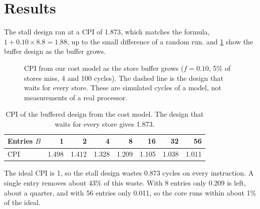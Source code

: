 \section{Results}
\label{sec:cpiresults}

The stall design ran at a CPI of 1.873, which matches the formula, $1 + 0.10 \times 8.8 = 1.88$, up to the small difference of a random run.  and \cref{tab:cpi} show the buffer design as the buffer grows.

\begin{figure}[!htbp]
\centering
{}
\caption{CPI from our cost model as the store buffer grows ($f = 0.10$, 5\% of stores miss, 4 and 100 cycles). The dashed line is the design that waits for every store. These are simulated cycles of a model, not measurements of a real processor.}
\label{fig:cpi}
\end{figure}

\begin{table}[!htbp]
\centering\small
\caption{CPI of the buffered design from the cost model. The design that waits for every store gives 1.873.}
\label{tab:cpi}
\begin{tabular}{@{}lrrrrrrr@{}}
\toprule
Entries $B$ & 1 & 2 & 4 & 8 & 16 & 32 & 56\\
\midrule
CPI & 1.498 & 1.412 & 1.328 & 1.209 & 1.105 & 1.038 & 1.011\\
\bottomrule
\end{tabular}
\end{table}

The ideal CPI is 1, so the stall design wastes 0.873 cycles on every instruction. A single entry removes about 43\% of this waste. With 8 entries only 0.209 is left, about a quarter, and with 56 entries only 0.011, so the core runs within about 1\% of the ideal.

